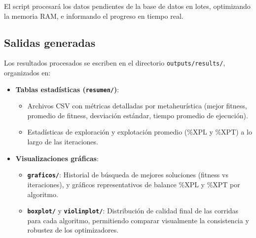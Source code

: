 El script procesará los datos pendientes de la base de datos en lotes, optimizando la memoria RAM, e informando el progreso en tiempo real.

\subsection{Salidas generadas}

Los resultados procesados se escriben en el directorio \texttt{outputs/results/}, organizados en:
\begin{itemize}
    \item \textbf{Tablas estadísticas (\texttt{resumen/})}:
    \begin{itemize}
        \item Archivos CSV con métricas detalladas por metaheurística (mejor fitness, promedio de fitness, desviación estándar, tiempo promedio de ejecución).
        \item Estadísticas de exploración y explotación promedio (\%XPL y \%XPT) a lo largo de las iteraciones.
    \end{itemize}
    
    \item \textbf{Visualizaciones gráficas}:
    \begin{itemize}
        \item \textbf{\texttt{graficos/}}: Historial de búsqueda de mejores soluciones (fitness vs iteraciones), y gráficos representativos de balance \%XPL y \%XPT por algoritmo.
        \item \textbf{\texttt{boxplot/}} y \textbf{\texttt{violinplot/}}: Distribución de calidad final de las corridas para cada algoritmo, permitiendo comparar visualmente la consistencia y robustez de los optimizadores.
    \end{itemize}
\end{itemize}
